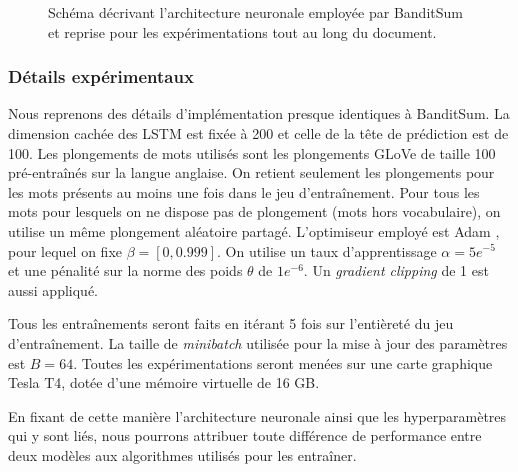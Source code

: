 \begin{figure}[h!]
    \caption{Schéma décrivant l'architecture neuronale employée par BanditSum et reprise pour 
    les expérimentations tout au long du document.}
    \label{fig:archi}
\end{figure}

\subsubsection*{Détails expérimentaux}

Nous reprenons des détails d'implémentation presque 
identiques à BanditSum.
La dimension cachée des LSTM est fixée à 200
et celle de la tête de prédiction est de 100.
Les plongements de mots utilisés sont les plongements GLoVe \citep{pennington2014glove} de taille 100 
pré-entraînés sur la langue anglaise.
On retient seulement les plongements pour les mots présents au moins une fois 
dans le jeu d'entraînement.
Pour tous les mots pour lesquels on ne dispose pas de plongement 
(mots hors vocabulaire), on utilise un même plongement 
aléatoire partagé.
L'optimiseur employé est Adam \citep{kingma2014method}, pour lequel on fixe 
$\beta = [0, 0.999]$.
On utilise un taux d'apprentissage $\alpha=5e^{-5}$ et une pénalité sur la norme 
des poids $\theta$ de $1e^{-6}$.
Un \textit{gradient clipping} de 1 est aussi appliqué.

Tous les entraînements seront faits en itérant 
5 fois sur l'entièreté du jeu d'entraînement.
La taille de \textit{minibatch} utilisée pour la mise à jour 
des paramètres est $B=64$.
Toutes les expérimentations seront menées 
sur une carte graphique Tesla T4, dotée d'une mémoire 
virtuelle de 16 GB. 

En fixant de cette manière l'architecture neuronale ainsi que 
les hyperparamètres qui y sont liés, nous pourrons attribuer
toute différence de performance entre deux modèles aux algorithmes 
utilisés pour les entraîner.

